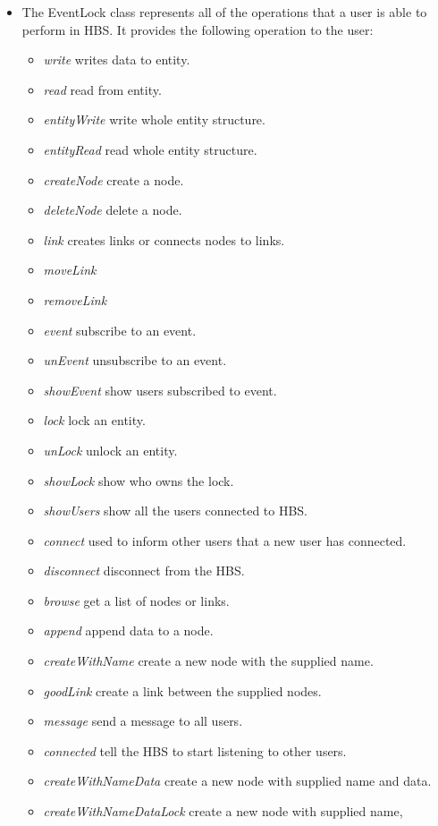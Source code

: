 \begin{itemize}
  \item The EventLock class represents all of the operations that a user is
  able to perform in HBS.  It provides the following operation to the user:
  \begin {itemize}
    \item {\em write} writes data to entity.
    \item {\em read} read from entity.
    \item {\em entityWrite} write whole entity structure.
    \item {\em entityRead} read whole entity structure.
    \item {\em createNode} create a node.
    \item {\em deleteNode} delete a node.
    \item {\em link} creates links or connects nodes to links.
    \item {\em moveLink} 
    \item {\em removeLink} 
    \item {\em event} subscribe to an event.
    \item {\em unEvent} unsubscribe to an event.
    \item {\em showEvent} show users subscribed to event.
    \item {\em lock} lock an entity.
    \item {\em unLock} unlock an entity.
    \item {\em showLock} show who owns the lock.
    \item {\em showUsers} show all the users connected to HBS.
    \item {\em connect} used to inform other users that a new user has connected.
    \item {\em disconnect} disconnect from the HBS.
    \item {\em browse} get a list of nodes or links.
    \item {\em append} append data to a node.
    \item {\em createWithName} create a new node with the supplied name.
    \item {\em goodLink} create a link between the supplied nodes.
    \item {\em message} send a message to all users.
    \item {\em connected} tell the HBS to start listening to other users.
    \item {\em createWithNameData} create a new node with supplied name and data.
    \item {\em createWithNameDataLock} create a new node with supplied name,

\end{itemize}
\end{itemize}
